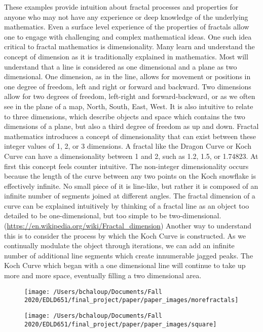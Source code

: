 \documentclass[english,jou]{apa6}
\begin{document}
These examples provide intuition about fractal processes and properties for anyone who may not have any experience or deep knowledge of the underlying mathematics. Even a surface level experience of the properties of fractals allow one to engage with challenging and complex mathematical ideas. One such idea critical to fractal mathematics is dimensionality. Many learn and understand the concept of dimension as it is traditionally explained in mathematics. Most will understand that a line is considered as one dimensional and a plane as two dimensional. One dimension, as in the line, allows for movement or positions in one degree of freedom, left and right or forward and backward. Two dimensions allow for two degrees of freedom, left-right and forward-backward, or as we often see in the plane of a map, North, South, East, West. It is also intuitive to relate to three dimensions, which describe objects and space which contains the two dimensions of a plane, but also a third degree of freedom as up and down. Fractal mathematics introduces a concept of dimensionality that can exist between these integer values of 1, 2, or 3 dimensions. A fractal like the Dragon Curve or Koch Curve can have a dimensionality between 1 and 2, such as 1.2, 1.5, or 1.74823. At first this concept feels counter intuitive. The non-integer dimensionality occurs because the length of the curve between any two points on the Koch snowflake is effectively infinite. No small piece of it is line-like, but rather it is composed of an infinite number of segments joined at different angles. The fractal dimension of a curve can be explained intuitively by thinking of a fractal line as an object too detailed to be one-dimensional, but too simple to be two-dimensional. (\url{https://en.wikipedia.org/wiki/Fractal_dimension}) Another way to understand this is to consider the process by which the Koch Curve is constructed. As we continually modulate the object through iterations, we can add an infinite number of additional line segments which create innumerable jagged peaks. The Koch Curve which began with a one dimensional line will continue to take up more and more space, eventually filling a two dimensional area.

\begin{figure}

\texttt{[image: /Users/bchaloup/Documents/Fall 2020/EDLD651/final\_project/paper/paper\_images/morefractals]} \hfill{}

\caption{ }\label{fig:unnamed-chunk-4-1}
\end{figure}
\begin{figure}

\texttt{[image: /Users/bchaloup/Documents/Fall 2020/EDLD651/final\_project/paper/paper\_images/square]} \hfill{}

\caption{ }\label{fig:unnamed-chunk-4-2}
\end{figure}
\end{document}
